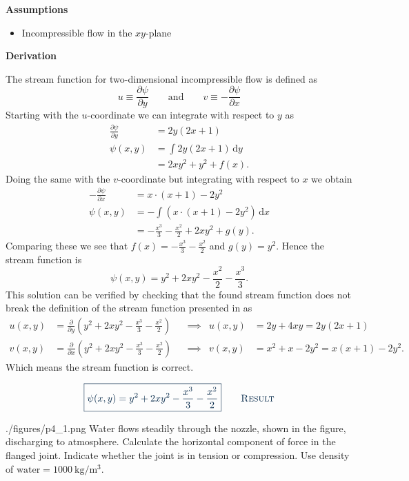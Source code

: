 \documentclass[a4paper]{article}
\newcounter{problem}
\numberwithin{equation}{problem}
\newcommand{\AUheading}[1]{%
  \par\vspace{.4\baselineskip}%
  {\sffamily\bfseries\color{AUblueDark}#1\par}%
  \nobreak%
}
\newenvironment{assumptions}[1][Assumptions]{%
  \AUheading{#1}
  \begin{itemize}[leftmargin=*,nosep]
}{\end{itemize}\par\medskip}
\newenvironment{derivation}[1][Derivation]{%
  \AUheading{#1}
  \begingroup\allowdisplaybreaks
  \setlength{\abovedisplayskip}{6pt}%
  \setlength{\belowdisplayskip}{6pt}%
  \setlength{\abovedisplayshortskip}{4pt}%
  \setlength{\belowdisplayshortskip}{4pt}%
}{\par\endgroup\medskip}
\newcommand{\finalresult}[1]{%
  \vspace{.2\baselineskip}%
  \begin{equation}
    {\color{AUblueDark}\boxed{\displaystyle #1}}
    \tag*{\textsc{\textcolor{AUblueDark}{Result}}}
  \end{equation}
  \newpage
}
\begin{document}
\begin{assumptions}
 \item Incompressible flow in the $xy$-plane
\end{assumptions}

\begin{derivation}
The stream function for two-dimensional incompressible flow is defined as
\begin{equation}\label{eq:strfun}
  u \equiv \frac{\partial \psi}{\partial y} \qquad \text{and} \qquad v \equiv - \frac{\partial \psi}{\partial x}
\end{equation}
Starting with the $u$-coordinate we can integrate with respect to $y$ as
\begin{align*}
  \frac{\partial \psi}{\partial y} &= 2y \left( 2x + 1 \right) \\
  \psi(x,y) &= \int 2y (2x + 1) \, \mathrm{d}y \\
            &= 2xy^2 + y^2 + f(x)
.\end{align*}
Doing the same with the $v$-coordinate but integrating with respect to $x$ we obtain
\begin{align*}
  -\frac{\partial \psi}{\partial x} &= x \cdot \left( x+1 \right) - 2y^2 \\
  \psi(x,y) &= -\int \left( x \cdot (x+1)- 2y^2 \right) \, \mathrm{d}x  \\
            &= - \frac{x^3}{3} - \frac{x^2}{2} + 2xy^2 + g(y)
.\end{align*}
Comparing these we see that $f(x) = - \frac{x^3}{3} - \frac{x^2}{2}$ and $g(y) = y^2$.
Hence the stream function is
\[ 
\psi(x,y) = y^2 + 2xy^2 - \frac{x^2}{2} - \frac{x^3}{3}
.\]
This solution can be verified by checking that the found stream function does not break the definition of the stream function presented in  as
\begin{align*}
  u(x,y) &= \frac{\partial }{\partial y} \left( y^2 + 2xy^2 - \frac{x^3}{3} - \frac{x^2}{2} \right) & &\implies & u(x,y) &= 2y + 4xy = 2y(2x + 1) \\
  v(x,y) &= \frac{\partial}{\partial x} \left( y^2 + 2xy^2 - \frac{x^3}{3} - \frac{x^2}{2} \right) & &\implies & v(x,y) &= x^2 + x - 2y^2 = x(x+1) - 2y^2
.\end{align*}
Which means the stream function is correct.
\end{derivation}

\finalresult{\psi(x,y) = y^2 + 2xy^2 - \frac{x^3}{3} - \frac{x^2}{2}}


\begin{problemwithimage}[0.5\linewidth]{./figures/p4_1.png}
Water flows steadily through the nozzle, shown in the figure, discharging to atmosphere.
Calculate the horizontal component of force in the flanged joint.
Indicate whether the joint is in tension or compression.
Use density of $\mathrm{water} = \qty{1000}{\kilogram\per\cubic\meter}$.
\end{problemwithimage}
\end{document}
